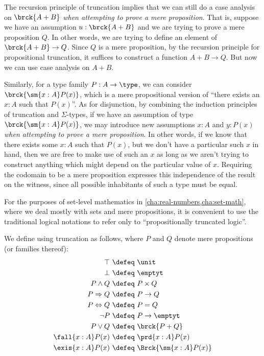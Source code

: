 The recursion principle of truncation implies that we can still do a case analysis on $\brck{A+B}$ \emph{when attempting to prove a mere proposition}.
That is, suppose we have an assumption $u:\brck{A+B}$ and we are trying to prove a mere proposition $Q$.
In other words, we are trying to define an element of $\brck{A+B} \to Q$.
Since $Q$ is a mere proposition, by the recursion principle for propositional truncation, it suffices to construct a function $A+B\to Q$.
But now we can use case analysis on $A+B$.

Similarly, for a type family $P:A\to\type$, we can consider $\brck{\sm{x:A} P(x)}$, which is a mere propositional version of ``there exists an $x:A$ such that $P(x)$''.
As for disjunction, by combining the induction principles of truncation and $\Sigma$-types, if we have an assumption of type $\brck{\sm{x:A} P(x)}$, we may introduce new assumptions $x:A$ and $y:P(x)$ \emph{when attempting to prove a mere proposition}.
In other words, if we know that there exists some $x:A$ such that $P(x)$, but we don't have a particular such $x$ in hand, then we are free to make use of such an $x$ as long as we aren't trying to construct anything which might depend on the particular value of $x$.
Requiring the codomain to be a mere proposition expresses this independence of the result on the witness, since all possible inhabitants of such a type must be equal.

For the purposes of set-level mathematics in \cref{cha:real-numbers,cha:set-math},
where we deal mostly with sets and mere propositions, it is convenient to use the
traditional logical notations to refer only to ``propositionally truncated logic''.

\begin{defn} \label{defn:logical-notation}
  We define 
  using truncation as follows, where $P$ and $Q$ denote mere propositions (or families thereof):
  {\allowdisplaybreaks
  \begin{align*}
    \top            &\ \defeq \ \unit \\
    \bot            &\ \defeq \ \emptyt \\
    P \land Q       &\ \defeq \ P \times Q \\
    P \Rightarrow Q &\ \defeq \ P \to Q \\
    P \Leftrightarrow Q &\ \defeq \ P = Q \\
    \neg P          &\ \defeq \ P \to \emptyt \\
    P \lor Q        &\ \defeq \ \brck{P + Q} \\
    \fall{x : A} P(x) &\ \defeq \ \prd{x : A} P(x) \\
    \exis{x : A} P(x) &\ \defeq \ \Brck{\sm{x : A} P(x)}
  \end{align*}}
\end{defn}

